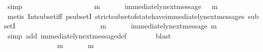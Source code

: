 \begin{isabellebody}
\ simp\isanewline
\ \ \ \ \isamarkupfalse%
\ {\isachardoublequoteopen}{\isasymforall}\ {\isasymsigma}\ {\isasymin}\ {\isasymSigma}{\isachardot}\ {\isasymforall}\ {\isasymsigma}{\isacharprime}\ {\isasymin}\ {\isasymSigma}{\isachardot}\ {\isasymnot}\ {\isasymsigma}\ {\isasymsubseteq}\ {\isasymsigma}{\isacharprime}\ {\isasymlongrightarrow}\ {\isacharparenleft}{\isasymexists}\ m\ {\isasymin}\ {\isasymsigma}\ {\isacharminus}\ {\isacharparenleft}{\isasymsigma}\ {\isasyminter}\ {\isasymsigma}{\isacharprime}{\isacharparenright}{\isachardot}\ immediately{\isacharunderscore}next{\isacharunderscore}message{\isacharparenleft}{\isasymsigma}\ {\isasyminter}\ {\isasymsigma}{\isacharprime}{\isacharcomma}\ m{\isacharparenright}{\isacharparenright}{\isachardoublequoteclose}\isanewline
\ \ \ \ \ \ \isamarkupfalse%
\ {\isacharparenleft}metis\ Int{\isacharunderscore}subset{\isacharunderscore}iff\ psubsetI\ strict{\isacharunderscore}subset{\isacharunderscore}of{\isacharunderscore}state{\isacharunderscore}have{\isacharunderscore}immediately{\isacharunderscore}next{\isacharunderscore}messages\ subsetI{\isacharparenright}\ \ \isanewline
\ \ \ \ \isamarkupfalse%
\ \isamarkupfalse%
\ {\isachardoublequoteopen}{\isasymforall}\ {\isasymsigma}\ {\isasymin}\ {\isasymSigma}{\isachardot}\ {\isasymforall}\ {\isasymsigma}{\isacharprime}\ {\isasymin}\ {\isasymSigma}{\isachardot}\ {\isasymnot}\ {\isasymsigma}\ {\isasymsubseteq}\ {\isasymsigma}{\isacharprime}\ {\isasymlongrightarrow}\ {\isacharparenleft}{\isasymexists}\ m\ {\isasymin}\ {\isasymsigma}\ {\isacharminus}\ {\isacharparenleft}{\isasymsigma}\ {\isasyminter}\ {\isasymsigma}{\isacharprime}{\isacharparenright}{\isachardot}\ immediately{\isacharunderscore}next{\isacharunderscore}message{\isacharparenleft}{\isasymsigma}{\isacharprime}{\isacharcomma}\ m{\isacharparenright}{\isacharparenright}{\isachardoublequoteclose}\isanewline
\ \ \ \ \ \ \isamarkupfalse%
\ {\isacharparenleft}simp\ add{\isacharcolon}\ immediately{\isacharunderscore}next{\isacharunderscore}message{\isacharunderscore}def{\isacharparenright}\isanewline
\ \ \ \ \ \ \isamarkupfalse%
\ blast\ \ \isanewline
\ \ \ \ \isamarkupfalse%
\ \isamarkupfalse%
\ {\isachardoublequoteopen}{\isasymforall}\ {\isasymsigma}\ {\isasymin}\ {\isasymSigma}{\isachardot}\ {\isasymforall}\ {\isasymsigma}{\isacharprime}\ {\isasymin}\ {\isasymSigma}{\isachardot}\ {\isasymnot}\ {\isasymsigma}\ {\isasymsubseteq}\ {\isasymsigma}{\isacharprime}\ {\isasymlongrightarrow}\ {\isacharparenleft}{\isasymexists}\ m\ {\isasymin}\ {\isasymsigma}\ {\isacharminus}\ {\isasymsigma}{\isacharprime}{\isachardot}\ {\isasymsigma}{\isacharprime}\ {\isasymunion}\ {\isacharbraceleft}m{\isacharbraceright}\ {\isasymin}\ {\isasymSigma}{\isacharparenright}{\isachardoublequoteclose}\isanewline

\end{isabellebody}
